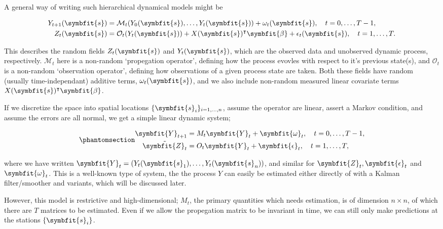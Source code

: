 \documentclass[
]{report}
\newcommand{\bv}[1]{\symbfit{#1}}
\theoremstyle{plain}
\theoremstyle{plain}
\theoremstyle{plain}
\theoremstyle{remark}
\begin{document}
A general way of writing such hierarchical dynamical models might be

\[\begin{split}
Y_{t+1}(\bv s) &= \mathcal M_t(Y_0(\bv s), \dots, Y_t(\bv s)) + \omega_t(\bv s), \quad t=0, \dots, T-1,\\
Z_t(\bv s) &= \mathcal O_t(Y_t(\bv s)) + X(\bv s)^{\intercal}\bv \beta + \epsilon_t(\bv s), \quad t=1,\dots,T.
\end{split}
\]

This describes the random fields \(Z_t(\bv s)\) and \(Y_t(\bv s)\),
which are the observed data and unobserved dynamic process,
respectively. \(\mathcal M_t\) here is a non-random `propegation
operator', defining how the process evovles with respect to it's
previous state(s), and \(\mathcal O_t\) is a non-random `observation
operator', defining how observations of a given process state are taken.
Both these fields have random (usually time-independant) additive terms,
\(\omega_t(\bv s)\), and we also include non-random measured linear
covariate terms \(X(\bv s)^{\intercal}\bv \beta\).

If we discretize the space into spatial locations
\(\{\bv s_i\}_{i=1,\dots, n}\), assume the operator are linear, assert a
Markov condition, and assume the errors are all normal, we get a simple
linear dynamic system;

\begin{equation}\phantomsection\label{eq-ldstm}{\begin{split}
\bv Y_{t+1} &= M_t\bv Y_t + \bv \omega_t, \quad t=0, \dots, T-1,\\
\tilde{\bv Z_t} &= O_t\bv Y_t + \bv \epsilon_t, \quad t=1,\dots,T,
\end{split}
}\end{equation}

where we have written \(\bv Y_t = (Y_t(\bv s_1),\dots, Y_t(\bv s_n))\),
and similar for \(\bv Z_t, \bv \epsilon_t\) and \(\bv\omega_t\). This is
a well-known type of system, the the process \(Y\) can easily be
estimated either directly of with a Kalman filter/smoother and variants,
which will be discussed later.

However, this model is restrictive and high-dimensional; \(M_t\), the
primary quantities which needs estimation, is of dimension
\(n\times n\), of which there are \(T\) matrices to be estimated. Even
if we allow the propegation matrix to be invariant in time, we can still
only make predictions at the stations \(\{\bv s_i\}\).
\end{document}
